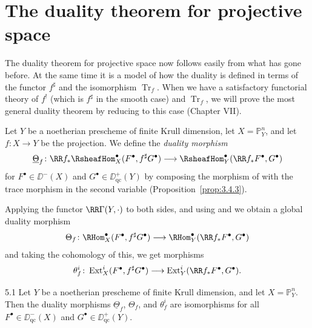 \section{The duality theorem for projective space}\label{sec:3.5}

The duality theorem for projective space now follows easily from what has gone before. At the same time it is a model of how the duality is defined in terms of the functor $f^{\sharp}$ and the isomorphism $\operatorname{Tr}_f$. When we have a satisfactory functorial theory of $f^!$ (which is $f^{\sharp}$ in the smooth case) and $\operatorname{Tr}_f$, we will prove the most general duality theorem by reducing to this case (Chapter VII).

Let $Y$ be a noetherian prescheme of finite Krull dimension, let $X=\mathbb{P}^n_Y$, and let $f\colon X\to Y$ be the projection. We define the \emph{duality morphism}
\[
\underline{\Theta}_f\colon \RR f_* \RsheafHom_X^\bullet(F^\bullet, f^{\sharp}G^\bullet) \longrightarrow \RsheafHom_Y^\bullet(\RR f_*F^\bullet, G^\bullet)
\]
for $F^\bullet\in\DD^-(X)$ and $G^\bullet\in\DD_{\mathrm{qc}}^+(Y)$ by composing the morphism of  with the trace morphism in the second variable (Proposition~\ref{prop:3.4.3}).

Applying the functor $\RR\Gamma(Y,\cdot)$ to both sides, and using  and  we obtain a global duality morphism
\[
\Theta_f \colon \RHom_X^\bullet(F^\bullet, f^{\sharp}G^\bullet) \longrightarrow \RHom_Y^\bullet(\RR f_*F^\bullet, G^\bullet)
\]
and taking the cohomology of this, we get morphisms
\[
\theta_f^i \colon \operatorname{Ext}_X^i(F^\bullet,f^{\sharp}G^\bullet) \longrightarrow \operatorname{Ext}_Y^i(\RR f_*F^\bullet,G^\bullet).
\]

\begin{booktheorem}{5.1}\label{thm:3.5.1}
Let $Y$ be a noetherian prescheme of finite Krull dimension, and let $X=\mathbb{P}^n_Y$. Then the duality morphisms $\underline{\Theta}_f$, $\Theta_f$, and $\theta_f^i$ are isomorphisms for all $F^\bullet\in\DD_{\mathrm{qc}}^-(X)$ and $G^\bullet\in\DD_{\mathrm{qc}}^+(Y)$.
\end{booktheorem}

